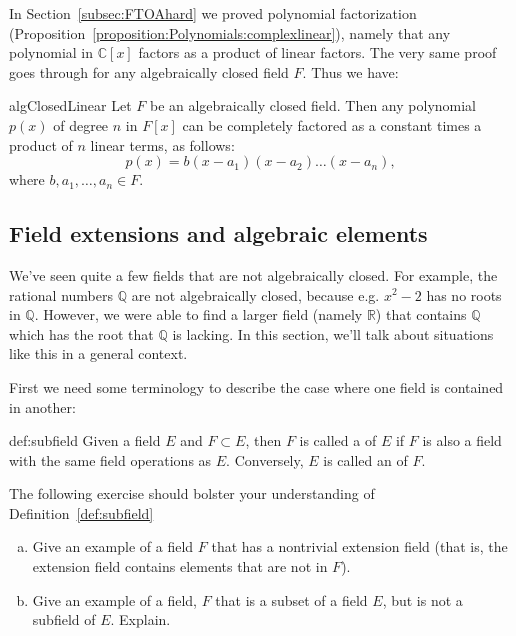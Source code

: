 In Section~\ref{subsec:FTOAhard} we proved polynomial factorization (Proposition~\ref{proposition:Polynomials:complexlinear}), namely that any polynomial in $\mathbb{C}[x]$ factors as a product of linear factors. The very same proof goes through for any algebraically closed field $F$.  Thus we have:

\begin{prop}{algClosedLinear}
Let $F$ be an algebraically closed field. Then any polynomial $p(x)$  of degree $n$ in $F[x]$ can be completely factored as a constant times a product of $n$ linear terms,   as follows:
\begin{equation}
p(x) = b(x -a_1)(x-a_2) \ldots (x - a_n),
\end{equation}
where $b,a_1,\ldots,a_n \in F$.
\end{prop}



\subsection{Field extensions and algebraic elements}
We've seen quite a few fields that are not algebraically closed. For example, the rational numbers $\mathbb{Q}$ are not algebraically closed, because e.g. $x^2 - 2$ has no  roots in $\mathbb{Q}$.  However, we were able to find a larger field (namely $\mathbb{R}$) that contains $\mathbb{Q}$ which has the root that $\mathbb{Q}$ is lacking. In this section, we'll talk about situations like this in a general context. 


First we need some  terminology to describe the case where one field is contained in  another:


\begin{defn}{def:subfield}  
Given a field $E$ and $F\subset E$, then $F$ is called a  of $E$ if $F$ is also a field with the same field operations as $E$. Conversely, $E$ is called an  of $F$.
 \end{defn}

The following exercise should  bolster your understanding of Definition~\ref{def:subfield}

\begin{exercise}{}
\begin{enumerate}[(a)]
\item
Give an example of a field $F$ that has a nontrivial extension field (that is, the extension field contains elements that are not in $F$).
\item
Give an example of a field, $F$ that is a subset of a field $E$, but is not a subfield of $E$. Explain.
\end{enumerate}
\end{exercise}

